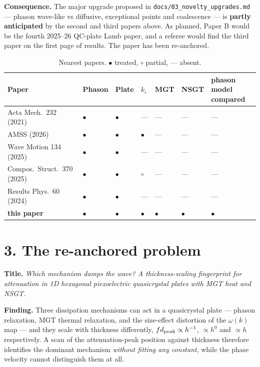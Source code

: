 \documentclass[11pt]{article}
\begin{document}
\textbf{Consequence.} The major upgrade proposed in \texttt{docs/03\_novelty\_upgrades.md} ---
phason wave-like vs diffusive, exceptional points and coalescence --- is \textbf{partly anticipated}
by the second and third papers above. As planned, Paper B would be the fourth 2025--26 QC-plate Lamb
paper, and a referee would find the third paper on the first page of results. The paper has been
re-anchored.

\begin{table}[h]
\centering\small
\caption{Nearest papers. $\bullet$ treated, $\circ$ partial, --- absent.}
\begin{tabular}{p{5.5cm}p{1.0cm}p{1.1cm}p{1.0cm}p{1.1cm}p{1.2cm}p{1.6cm}}
\hline
Paper & Phason & Plate & $k_i$ & MGT & NSGT & phason model compared \\
\hline
Acta Mech.\ 232 (2021) & $\bullet$ & $\bullet$ & --- & --- & --- & --- \\
AMSS (2026) & $\bullet$ & $\bullet$ & $\bullet$ & --- & --- & --- \\
Wave Motion 134 (2025) & $\bullet$ & $\bullet$ & --- & --- & --- & --- \\
Compos.\ Struct.\ 370 (2025) & $\bullet$ & $\bullet$ & $\circ$ & --- & --- & --- \\
Results Phys.\ 60 (2024) & $\bullet$ & $\bullet$ & --- & --- & --- & --- \\
\hline
\textbf{this paper} & $\bullet$ & $\bullet$ & $\bullet$ & $\bullet$ & $\bullet$ & $\bullet$ \\
\hline
\end{tabular}
\end{table}

\section*{3. The re-anchored problem}
\textbf{Title.} \emph{Which mechanism damps the wave? A thickness-scaling fingerprint for
attenuation in 1D hexagonal piezoelectric quasicrystal plates with MGT heat and NSGT.}

\textbf{Finding.} Three dissipation mechanisms can act in a quasicrystal plate --- phason
relaxation, MGT thermal relaxation, and the size-effect distortion of the $\omega(k)$ map --- and
they scale with thickness differently, $fd_{\rm peak}\propto h^{-1}$, $\propto h^{0}$ and
$\propto h$ respectively. A scan of the attenuation-peak position against thickness therefore
identifies the dominant mechanism \emph{without fitting any constant}, while the phase velocity
cannot distinguish them at all.
\end{document}
